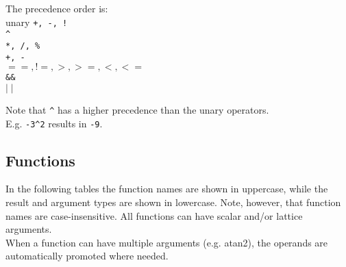 \begin{description}
  \item The precedence order is:
       \\unary \texttt{+, -, !}
       \\\verb+^+
       \\\texttt{*, /, \%}
       \\\texttt{+, -}
       \\\texttt{$==, !=, >, >=, <, <=$}
       \\\texttt{\&\&}
       \\\texttt{$\mid\mid$}
\end{description}
Note that \verb+^+ has a higher precedence than the unary operators.
\\E.g. \texttt{-3}\verb+^+\texttt{2} results in \texttt{-9}.

\subsection{\label{LEL:FUNCTIONS}Functions}
In the following tables the function names are shown in uppercase,
while the result and argument types are shown in lowercase.
Note, however, that function names are case-insensitive.
All functions can have scalar and/or lattice arguments.
\\When a function can have multiple arguments (e.g. atan2), the
operands are automatically promoted where needed.

